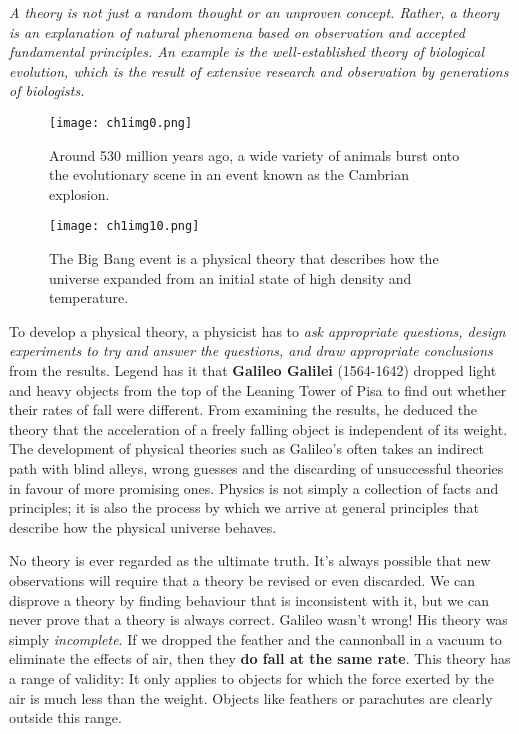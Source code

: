 \textit{A theory is not just a random thought or an unproven concept. Rather, a theory is an explanation of natural phenomena based on observation and accepted fundamental principles. An example is the well-established theory of biological evolution, which is the result of extensive research and observation by generations of biologists.}
\FloatBarrier
\begin{figure}[!h]
  \centering
  \texttt{[image: ch1img0.png]}
  \caption{Around 530 million years ago, a wide variety of animals burst onto the evolutionary scene in an event known as the Cambrian explosion.}
  \label{fig:ch1img0}
  \medskip
  \centering
  \texttt{[image: ch1img10.png]}
  \caption{The Big Bang event is a physical theory that describes how the universe expanded from an initial state of high density and temperature.}
  \label{fig:ch1img10}
  \bigskip
\end{figure}
\FloatBarrier

To develop a physical theory, a physicist has to \textit{ask appropriate questions, design experiments to try and answer the questions, and draw appropriate conclusions} from the results. Legend has it that \textbf{Galileo Galilei} (1564-1642) dropped light and heavy objects from the top of the Leaning Tower of Pisa to find out whether their rates of fall were different. From examining the results, he deduced the theory that the acceleration of a freely falling object is independent of its weight. The development of physical theories such as Galileo's often takes an indirect path with blind alleys, wrong guesses and the discarding of unsuccessful theories in favour of more promising ones. Physics is not simply a collection of facts and principles; it is also the process by which we arrive at general principles that describe how the physical universe behaves.

No theory is ever regarded as the ultimate truth. It's always possible that new observations will require that a theory be revised or even discarded. We can disprove a theory by finding behaviour that is inconsistent with it, but we can never prove that a theory is always correct.
Galileo wasn't wrong! His theory was simply \textit{incomplete}. If we dropped the feather and the cannonball in a vacuum to eliminate the effects of air, then they \textbf{do fall at the same rate}. This theory has a range of validity: It only applies to objects for which the force exerted by the air is much less than the weight. Objects like feathers or parachutes are clearly outside this range.


